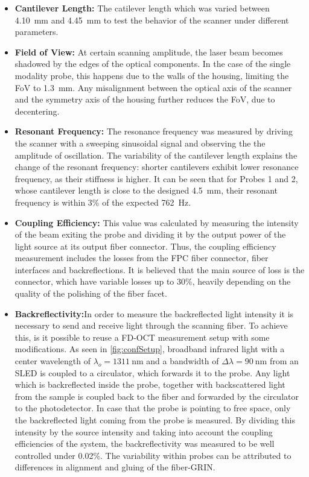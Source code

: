 \begin{itemize}


\item \textbf{Cantilever Length:} The catilever length which was varied between \SI{4.10}{\milli\meter} and \SI{4.45}{\milli\meter} to test the behavior of the scanner under different parameters. 

\item \textbf{Field of View:} At certain scanning amplitude, the laser beam becomes shadowed by the edges of the optical components. In the case of the single modality probe, this happens due to the walls of the housing, limiting the FoV to \SI{1.3}{\milli\meter}. Any misalignment between the optical axis of the scanner and the symmetry axis of the housing further reduces the FoV, due to decentering.

\item \textbf{Resonant Frequency:} The resonance frequency was measured by driving the scanner with a sweeping sinusoidal signal and observing the  the amplitude of oscillation. The variability of the cantilever length explains the change of the resonant frequency: shorter cantilevers exhibit lower resonance frequency, as their stiffness is higher. It can be seen that for Probes 1 and 2, whose cantilever length is close to the designed \SI{4.5}{\milli\meter}, their resonant frequency is within 3\% of the expected \SI{762}{\hertz}. 

\item \textbf{Coupling Efficiency:} This value was calculated by measuring the intensity of the beam exiting the probe and dividing it by the output power of the light source at its output fiber connector. Thus, the coupling efficiency measurement includes the losses from the FPC fiber connector, fiber interfaces and backreflections. It is believed that the main source of loss is the connector, which have variable losses up to 30\%, heavily depending on the quality of the polishing of the fiber facet. 

\item \textbf{Backreflectivity:}In order to measure the backreflected light intensity it is necessary to send and receive light through the scanning fiber. To achieve this, is it possible to reuse a FD-OCT measurement setup with some modifications. As seen in \autoref{fig:confSetup}, broadband infrared light with a center wavelength of $\lambda_o = \SI{1311}{\nano\meter}$ and a bandwidth of $\Delta \lambda = \SI{90}{\nano\meter} $ from an SLED is coupled to a circulator, which forwards it to the probe. Any light which is backreflected inside the probe, together with backscattered light from the sample is coupled back to the fiber and forwarded by the circulator to the photodetector. In case that the probe is pointing to free space, only the backreflected light coming from the probe is measured. By dividing this intensity by the source intensity and taking into account the coupling efficiencies of the system, the backreflectivity was measured to be well controlled under 0.02\%. The variability within probes can be attributed to differences in alignment and gluing of the fiber-GRIN.

\end{itemize}

